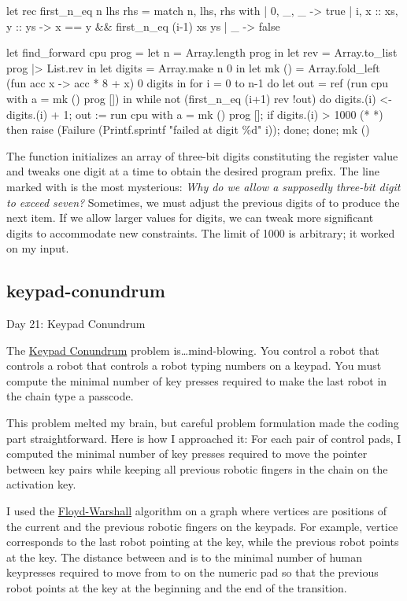 \documentclass{article}
\begin{document}
\begin{code}[ocaml]
let rec first_n_eq n lhs rhs = match n, lhs, rhs with
  | 0, _, _ -> true
  | i, x :: xs, y :: ys -> x == y && first_n_eq (i-1) xs ys
  | _ -> false

let find_forward cpu prog =
  let n = Array.length prog in
  let rev = Array.to_list prog |> List.rev in
  let digits = Array.make n 0 in
  let mk () = Array.fold_left (fun acc x -> acc * 8 + x) 0 digits in
  for i = 0 to n-1 do
    let out = ref (run {cpu with a = mk ()} prog []) in
    while not (first_n_eq (i+1) rev !out) do
      digits.(i) <- digits.(i) + 1;
      out := run {cpu with a = mk ()} prog [];
      if digits.(i) > 1000 (*  *)
      then raise (Failure (Printf.sprintf "failed at digit \%d" i));
    done;
  done;
  mk ()
\end{code}

The  function initializes an array of three-bit digits constituting the  register value and tweaks one digit at a time to obtain the desired program prefix.
The line marked with  is the most mysterious:
\emph{Why do we allow a supposedly three-bit digit to exceed seven?}
Sometimes, we must adjust the previous digits of  to produce the next item.
If we allow larger values for digits, we can tweak more significant digits to accommodate new constraints.
The limit of 1000 is arbitrary; it worked on my input.

\subsection{keypad-conundrum}{Day 21: Keypad Conundrum}

The \href{https://adventofcode.com/2024/day/21}{Keypad Conundrum} problem is\ldots  mind-blowing.
You control a robot that controls a robot that controls a robot typing numbers on a keypad.
You must compute the minimal number of key presses required to make the last robot in the chain type a passcode.

This problem melted my brain, but careful problem formulation made the coding part straightforward.
Here is how I approached it: For each pair of control pads, I computed the minimal number of key presses required to move the pointer between key pairs while keeping all previous robotic fingers in the chain on the activation key.

I used the \href{https://en.wikipedia.org/wiki/Floyd%E2%80%93Warshall_algorithm}{Floyd-Warshall} algorithm on a graph where vertices are positions of the current and the previous robotic fingers on the keypads.
For example, vertice  corresponds to the last robot pointing at the  key, while the previous robot points at the  key.
The distance between  and  is to the minimal number of human keypresses required to move from  to  on the numeric pad
so that the previous robot points at the  key at the beginning and the end of the transition.
\end{document}
